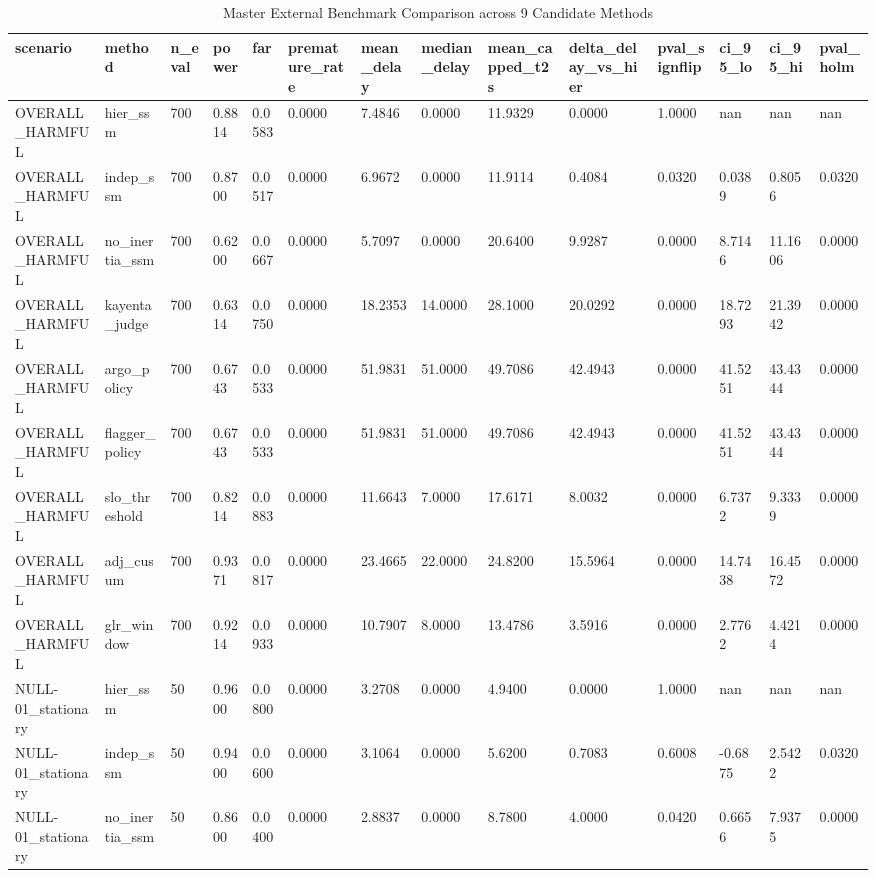 \begin{table}[htbp]
\centering
\caption{Master External Benchmark Comparison across 9 Candidate Methods}
\label{tab:table_T8_master_benchmark}
\begin{tabular}{llllllllllllll}
\hline
scenario & method & n\_eval & power & far & premature\_rate & mean\_delay & median\_delay & mean\_capped\_t2s & delta\_delay\_vs\_hier & pval\_signflip & ci\_95\_lo & ci\_95\_hi & pval\_holm \\
\hline
OVERALL\_HARMFUL & hier\_ssm & 700 & 0.8814 & 0.0583 & 0.0000 & 7.4846 & 0.0000 & 11.9329 & 0.0000 & 1.0000 & nan & nan & nan \\
OVERALL\_HARMFUL & indep\_ssm & 700 & 0.8700 & 0.0517 & 0.0000 & 6.9672 & 0.0000 & 11.9114 & 0.4084 & 0.0320 & 0.0389 & 0.8056 & 0.0320 \\
OVERALL\_HARMFUL & no\_inertia\_ssm & 700 & 0.6200 & 0.0667 & 0.0000 & 5.7097 & 0.0000 & 20.6400 & 9.9287 & 0.0000 & 8.7146 & 11.1606 & 0.0000 \\
OVERALL\_HARMFUL & kayenta\_judge & 700 & 0.6314 & 0.0750 & 0.0000 & 18.2353 & 14.0000 & 28.1000 & 20.0292 & 0.0000 & 18.7293 & 21.3942 & 0.0000 \\
OVERALL\_HARMFUL & argo\_policy & 700 & 0.6743 & 0.0533 & 0.0000 & 51.9831 & 51.0000 & 49.7086 & 42.4943 & 0.0000 & 41.5251 & 43.4344 & 0.0000 \\
OVERALL\_HARMFUL & flagger\_policy & 700 & 0.6743 & 0.0533 & 0.0000 & 51.9831 & 51.0000 & 49.7086 & 42.4943 & 0.0000 & 41.5251 & 43.4344 & 0.0000 \\
OVERALL\_HARMFUL & slo\_threshold & 700 & 0.8214 & 0.0883 & 0.0000 & 11.6643 & 7.0000 & 17.6171 & 8.0032 & 0.0000 & 6.7372 & 9.3339 & 0.0000 \\
OVERALL\_HARMFUL & adj\_cusum & 700 & 0.9371 & 0.0817 & 0.0000 & 23.4665 & 22.0000 & 24.8200 & 15.5964 & 0.0000 & 14.7438 & 16.4572 & 0.0000 \\
OVERALL\_HARMFUL & glr\_window & 700 & 0.9214 & 0.0933 & 0.0000 & 10.7907 & 8.0000 & 13.4786 & 3.5916 & 0.0000 & 2.7762 & 4.4214 & 0.0000 \\
NULL-01\_stationary & hier\_ssm & 50 & 0.9600 & 0.0800 & 0.0000 & 3.2708 & 0.0000 & 4.9400 & 0.0000 & 1.0000 & nan & nan & nan \\
NULL-01\_stationary & indep\_ssm & 50 & 0.9400 & 0.0600 & 0.0000 & 3.1064 & 0.0000 & 5.6200 & 0.7083 & 0.6008 & -0.6875 & 2.5422 & 0.0320 \\
NULL-01\_stationary & no\_inertia\_ssm & 50 & 0.8600 & 0.0400 & 0.0000 & 2.8837 & 0.0000 & 8.7800 & 4.0000 & 0.0420 & 0.6656 & 7.9375 & 0.0000 \\

\end{tabular}
\end{table}
